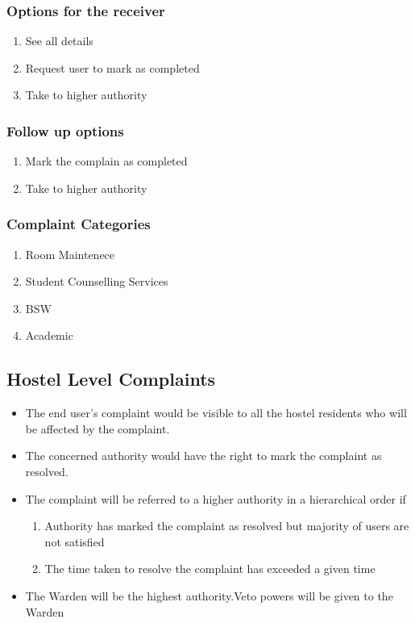 \documentclass{article}
\begin{document}
			\subsubsection{Options for the receiver}
				\begin{enumerate}
					\item See all details
					\item Request user to mark as completed
					\item Take to higher authority
				\end{enumerate}
			\subsubsection{Follow up options}
				\begin{enumerate}
					\item Mark the complain as completed
					\item Take to higher authority
				\end{enumerate}
			\subsubsection{Complaint Categories}
				\begin{enumerate}
					\item Room Maintenece
					\item Student Counselling Services
					\item BSW 
					\item Academic
				\end{enumerate}
		\subsection{Hostel Level Complaints}
		\begin{itemize}
		\item The end user's complaint would be visible to all the hostel residents who will be affected by the complaint.
		\item The concerned authority would have the right to mark the complaint as resolved.
		\item The complaint will be referred to a higher authority in a hierarchical order if 
			\begin{enumerate}
			\item Authority has marked the complaint as resolved but majority of users are not satisfied
			\item The time taken to resolve the complaint has exceeded a given time
			\end{enumerate}
		\item The Warden will be the highest authority.Veto powers will be given to the Warden
		\end{itemize}
\end{document}
